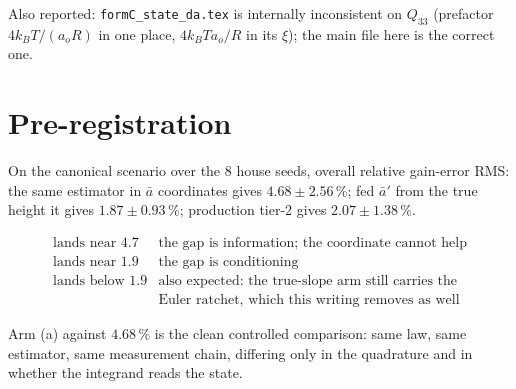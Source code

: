 \documentclass[11pt,a4paper,fontset=none]{ctexart}
\newcommand{\ba}{\bar{a}}
\begin{document}
Also reported: \texttt{formC\_state\_da.tex} is internally inconsistent on
$Q_{33}$ (prefactor $4k_BT/(a_oR)$ in one place, $4k_BT a_o/R$ in its $\xi$);
the main file here is the correct one.

\section*{Pre-registration}

On the canonical scenario over the 8 house seeds, overall relative gain-error
RMS: the same estimator in $\ba$ coordinates gives $4.68 \pm 2.56\,\%$; fed
$\ba'$ from the true height it gives $1.87 \pm 0.93\,\%$; production tier-2
gives $2.07 \pm 1.38\,\%$.

\begin{equation*}
\begin{array}{ll}
\text{lands near } 4.7 & \text{the gap is information; the coordinate cannot help} \\
\text{lands near } 1.9 & \text{the gap is conditioning} \\
\text{lands below } 1.9 & \text{also expected: the true-slope arm still carries the}\\
 & \text{Euler ratchet, which this writing removes as well}
\end{array}
\end{equation*}

Arm (a) against $4.68\,\%$ is the clean controlled comparison: same law, same
estimator, same measurement chain, differing only in the quadrature and in
whether the integrand reads the state.
\end{document}
